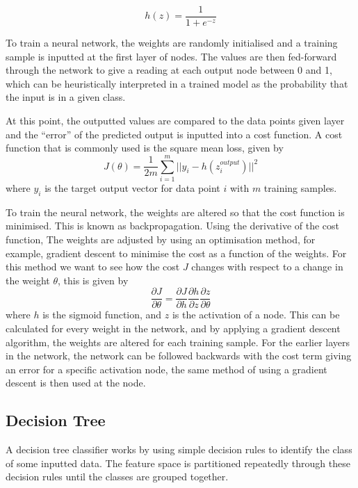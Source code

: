 \documentclass[a4paper,11pt,twoside]{article}
\begin{document}
\begin{equation}
h(z)=\frac{1}{1+e^{-z}}
\end{equation}

To train a neural network, the weights are randomly initialised and a training sample is inputted at the first layer of nodes. The values are then fed-forward through the network to give a reading at each output node between 0 and 1, which can be heuristically interpreted in a trained model as the probability that the input is in a given class. 
\newline

At this point, the outputted values are compared to the data points given layer and the “error” of the predicted output is inputted into a cost function. A cost function that is commonly used is the square mean loss, given by
\begin{equation}
J(\theta) = \frac{1}{2m}\sum_{i=1}^m ||y_i-h(z^{output}_i)||^2
\end{equation}
where $y_i$ is the target output vector for data point $i$ with $m$ training samples.
\newline

To train the neural network, the weights are altered so that the cost function is minimised.  This is known as backpropagation. Using the derivative of the cost function, The weights are adjusted by using an optimisation method, for example, gradient descent to minimise the cost as a function of the weights. For this method we want to see how the cost $J$ changes with respect to a change in the weight $\theta$, this is given by
\begin{equation}
\frac{\partial J}{\partial \theta} = \frac{\partial J}{\partial h} \frac{\partial h}{\partial z} \frac{\partial z}{\partial \theta}
\end{equation}
where $h$ is the sigmoid function, and $z$ is the activation of a node. This can be calculated for every weight in the network, and by applying a gradient descent algorithm, the weights are altered for each training sample. For the earlier layers in the network, the network can be followed backwards with the cost term giving an error for a specific activation node, the same method of using a gradient descent is then used at the node.

\subsection{Decision Tree}

A decision tree classifier works by using simple decision rules to identify the class of some inputted data. The feature space is partitioned repeatedly through these decision rules until the classes are grouped together. 
\end{document}
